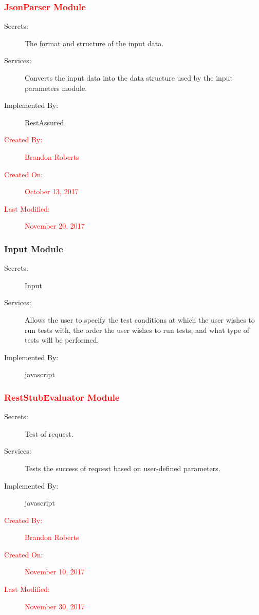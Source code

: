 \documentclass[12pt, titlepage]{article}
\begin{document}
\subsubsection{\textcolor{red}{JsonParser Module}}
\begin{description}
\item[Secrets:]The format and structure of the input data.
\item[Services:]Converts the input data into the data structure used by the
  input parameters module.
\item[Implemented By:] RestAssured
\item[\textcolor{red}{Created By:}] \textcolor{red}{Brandon Roberts}
\item[\textcolor{red}{Created On:}] \textcolor{red}{October 13, 2017}
\item[\textcolor{red}{Last Modified:}] \textcolor{red}{November 20, 2017}
\end{description}


\subsubsection{Input Module}\label{m1}
\begin{description}
\item[Secrets:] Input
\item[Services:] Allows the user to specify the test conditions at which the user wishes to run tests with, the order the user wishes to run tests, and what type of tests will be performed.
\item[Implemented By:] javascript
\end{description}

\subsubsection{\textcolor{red}{RestStubEvaluator Module}}\label{m2}
\begin{description}
\item[Secrets:] Test of request.
\item[Services:] Tests the success of request based on user-defined parameters.
\item[Implemented By:] javascript
\item[\textcolor{red}{Created By:}] \textcolor{red}{Brandon Roberts}
\item[\textcolor{red}{Created On:}] \textcolor{red}{November 10, 2017}
\item[\textcolor{red}{Last Modified:}] \textcolor{red}{November 30, 2017}
\end{description}
\end{document}
